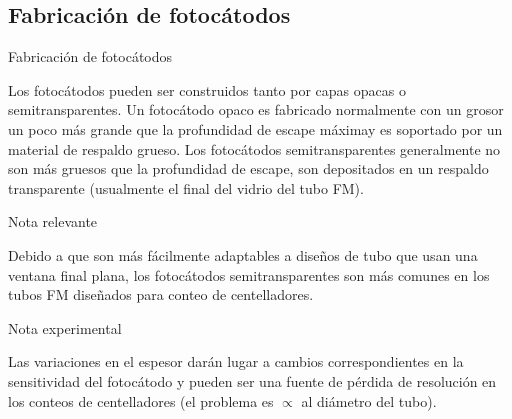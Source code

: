 \documentclass[a4paper,10pt]{beamer}
\begin{document}
\subsection{Fabricación de fotocátodos}
\begin{frame}{Fabricación de fotocátodos}
 \begin{justify}
  
  \small{Los fotocátodos pueden ser construidos tanto por capas opacas o semitransparentes.
  Un fotocátodo opaco es fabricado normalmente con un grosor un poco más grande 
  que la profundidad de escape máxima\footnotemark y es soportado por un material
  de respaldo grueso. Los fotocátodos semitransparentes generalmente no son más 
  gruesos que la profundidad de escape, son depositados en un respaldo transparente 
  (usualmente el final del vidrio del tubo FM).}
  
  \begin{block}{Nota relevante}
  \begin{justify}
   Debido a que son más fácilmente adaptables a diseños de tubo que usan una 
   ventana final plana, los fotocátodos semitransparentes son más comunes en los
   tubos FM diseñados para conteo de centelladores.
   \end{justify}
  \end{block}
  
  \begin{exampleblock}{Nota experimental}
  \begin{justify}
   Las variaciones en el espesor darán lugar a cambios correspondientes en la sensitividad 
   del fotocátodo y pueden ser una fuente de pérdida de resolución en los conteos de 
   centelladores (el problema es $\propto$ al diámetro del tubo).
   \end{justify}
  \end{exampleblock}

  
 \end{justify}

\end{frame}
\end{document}
